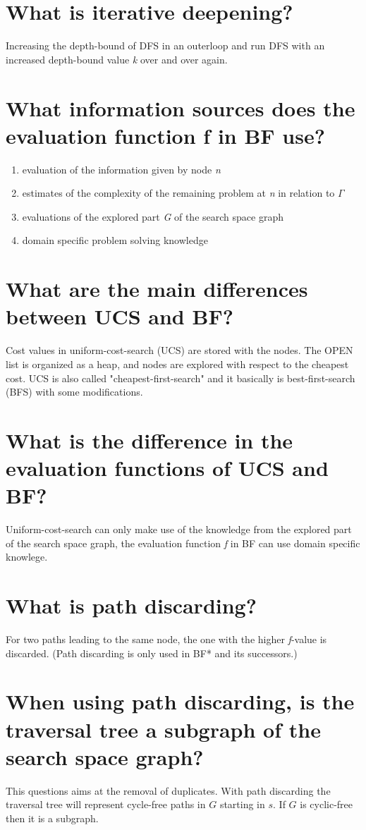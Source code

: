 \documentclass[12pt, a4paper]{article}
\begin{document}
\section{What is iterative deepening?}
Increasing the depth-bound of DFS in an outerloop and run DFS with an increased depth-bound value \textit{k} over and over again.

\section{What information sources does the evaluation function f in BF use?}
\begin{enumerate}
\item evaluation of the information given by node \textit{n}
\item estimates of the complexity of the remaining problem at \textit{n} in relation to $\Gamma$
\item evaluations of the explored part \textit{G} of the search space graph
\item domain specific problem solving knowledge
\end{enumerate}

\section{What are the main differences between UCS and BF?}
Cost values in uniform-cost-search (UCS) are stored with the nodes. The OPEN list is organized as a heap, and nodes are explored with respect to the cheapest cost. UCS is also called "cheapest-first-search" and it basically is best-first-search (BFS) with some modifications.

\section{What is the difference in the evaluation functions of UCS and BF?}
Uniform-cost-search can only make use of the knowledge from the explored part of the search space graph, the evaluation function \textit{f} in BF can use domain specific knowlege.

\section{What is path discarding?}
For two paths leading to the same node, the one with the higher \textit{f}-value is discarded. (Path discarding is only used in BF* and its successors.)

\section{When using path discarding, is the traversal tree a subgraph of the search space graph?}
This questions aims at the removal of duplicates. With path discarding the traversal tree will represent cycle-free paths in $G$ starting in $s$. If $G$ is cyclic-free then it is a subgraph.
\end{document}
